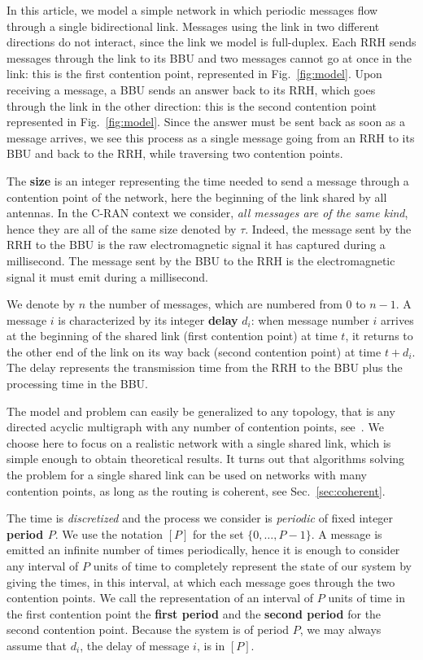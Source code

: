 \documentclass[pdflatex,sn-mathphys,iicol]{sn-jnl}%
\theoremstyle{thmstyleone}%
\theoremstyle{thmstyletwo}%
\theoremstyle{thmstylethree}%
\begin{document}
In this article, we model a simple network in which periodic messages flow through a single bidirectional link. Messages using the link in two different directions do not interact, since the link we model is full-duplex.
 Each RRH sends messages through the link to its BBU and two messages cannot go at once in the link: this is the first contention point, represented in Fig.~\ref{fig:model}. Upon receiving a message, a BBU sends an answer back to its RRH, which goes through the link in the other direction: this is the second contention point represented in Fig.~\ref{fig:model}. Since the answer must be sent back as soon as a message arrives, we see this process as a single message going from an RRH to its BBU and back to the RRH, while traversing two contention points. 


The \textbf{size} is an integer representing the time needed to send a message through a contention point of the network, here the beginning of the link shared by all antennas. In the C-RAN context we consider, \emph{all messages are of the same kind}, hence they are all of the same size denoted by $\tau$. Indeed, the message sent by the RRH to the BBU is the raw electromagnetic signal it has captured during a millisecond. The message sent by the BBU to the RRH is the electromagnetic signal it must emit during a millisecond.

 We denote by $n$ the number of messages, which are numbered from $0$ to $n-1$. A message $i$ is characterized by its integer \textbf{delay} $d_i$: when message number $i$ arrives at the beginning of the shared link (first contention point) at time $t$, it returns to the other end of the link on its way back (second contention point) at time $t + d_i$. The delay represents the transmission time from the RRH to the BBU plus the processing time in the BBU. 

  The model and problem can easily be generalized to any topology, that is any directed acyclic multigraph with any number of contention points, see~\cite{bartharxiv2018deterministic}. We choose here to focus on a realistic network with a single shared link, which is simple enough to obtain theoretical results. It turns out that algorithms solving the problem for a single shared link can be used on networks with many contention points, as long as the routing is coherent, see Sec.~\ref{sec:coherent}. 

The time is \emph{discretized} and the process we consider is \emph{periodic} of fixed integer \textbf{period $P$}. We use the notation $[P]$ for the set $\{0,\dots,P-1\}$. A message is emitted an infinite number of times periodically, hence it is enough to consider any interval of $P$ units of time to completely represent the state of our system by giving the times, in this interval, at which each message goes through the two contention points. We call the representation of an interval of $P$ units of time in the first contention point the \textbf{first period} and the \textbf{second period} for the second contention point. Because the system is of period $P$, we may always assume that $d_i$, the delay of message $i$, is in $[P]$. 
\end{document}
